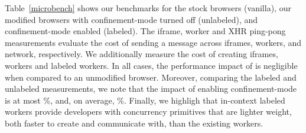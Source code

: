 Table~\ref{microbench} shows our benchmarks for the stock browsers
(vanilla), our modified browsers with confinement-mode turned off
(unlabeled), and confinement-mode enabled (labeled).
%
The iframe, worker and XHR ping-pong measurements evaluate the cost of 
sending a message across iframes, workers, and network, respectively.
%
We additionally measure the cost of creating iframes, workers and
labeled workers.
%
In all cases, the performance impact of \sys{} is negligible when
compared to an unmodified browser.
%
Moreover, comparing the labeled and unlabeled measurements, we 
note that the impact of enabling confinement-mode is at most
\%, and, on average, \%.
%
Finally, we highligh that in-context labeled workers provide
developers with concurrency primitives that are lighter weight, both
faster to create and communicate with, than the existing workers.


